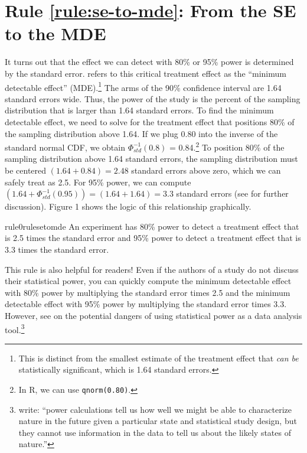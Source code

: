 \documentclass[12pt]{article}
\begin{document}
\section*{Rule \ref{rule:se-to-mde}: From the SE to the MDE}

It turns out that the effect we can detect with 80\% or 95\% power is determined by the standard error. 
\cite{Bloom1995} refers to this critical treatment effect as the ``minimum detectable effect'' (MDE).\footnote{
  This is distinct from the smallest estimate of the treatment effect that \textit{can be} statistically significant, which is 1.64 standard errors.
}
The arms of the 90\% confidence interval are 1.64 standard errors wide. 
Thus, the power of the study is the percent of the sampling distribution that is larger than 1.64 standard errors. 
To find the minimum detectable effect, we need to solve for the treatment effect that positions 80\% of the sampling distribution above 1.64. 
If we plug 0.80 into the inverse of the standard normal CDF, we obtain $\Phi_{std}^{- 1}(0.8)$ = 0.84.\footnote{
  In R, we can use \texttt{qnorm(0.80)}.
  } 
To position 80\% of the sampling distribution above 1.64 standard errors, the sampling distribution must be centered $(1.64 + 0.84) = 2.48$ standard errors above zero, which we can safely treat as 2.5. For 95\% power, we can compute $(1.64 + \Phi_{std}^{- 1}(0.95)) = (1.64 + 1.64) = 3.3$ standard errors (see \citealt{Bloom1995} for further discussion). 
Figure 1 shows the logic of this relationship graphically.

\begin{restatable}{rule0}{rulesetomde}
\label{rule:se-to-mde}
An experiment has 80\% power to detect a treatment effect that is 2.5 times the standard error and 95\% power to detect a treatment effect that is 3.3 times the standard error.
\end{restatable}

This rule is also helpful for readers! 
Even if the authors of a study do not discuss their statistical power, you can quickly compute the minimum detectable effect with 80\% power by multiplying the standard error times 2.5 and the minimum detectable effect with 95\% power by multiplying the standard error times 3.3.
However, see \cite{Hoenig2001} on the potential dangers of using statistical power as a data analysis tool.\footnote{
  \citet[5]{Hoenig2001} write: ``power calculations tell us how well we might be able to characterize nature in the future given a particular state and statistical study design, but they cannot use information in the data to tell us about the likely states of nature.''
}
\end{document}
